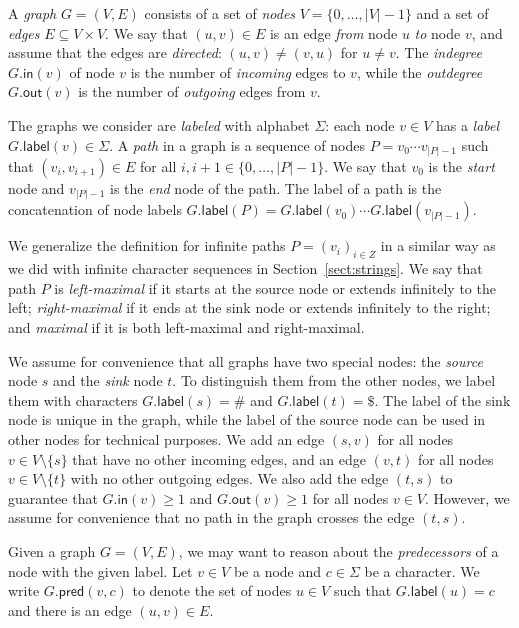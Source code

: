 \documentclass[a4paper,UKenglish]{lipics-v2016}
\newcommand{\set}[1]{\ensuremath{\{ #1 \}}}
\newcommand{\abs}[1]{\ensuremath{\lvert #1 \rvert}}
\newcommand{\gindegree}{\ensuremath{\mathsf{in}}}
\newcommand{\goutdegree}{\ensuremath{\mathsf{out}}}
\newcommand{\glabel}{\ensuremath{\mathsf{label}}}
\newcommand{\gpred}{\ensuremath{\mathsf{pred}}}
\begin{document}
A \emph{graph} $G = (V, E)$ consists of a set of \emph{nodes} $V = \set{0, \dotsc, \abs{V}-1}$ and a set of \emph{edges} $E \subseteq V \times V$. We say that $(u, v) \in E$ is an edge \emph{from} node $u$ \emph{to} node $v$, and assume that the edges are \emph{directed}: $(u, v) \ne (v, u)$ for $u \ne v$. The \emph{indegree} $G.\gindegree(v)$ of node $v$ is the number of \emph{incoming} edges to $v$, while the \emph{outdegree} $G.\goutdegree(v)$ is the number of \emph{outgoing} edges from $v$.

The graphs we consider are \emph{labeled} with alphabet $\Sigma$: each node $v \in V$ has a \emph{label} $G.\glabel(v) \in \Sigma$. A \emph{path} in a graph is a sequence of nodes $P = v_{0} \dotsm v_{\abs{P}-1}$ such that $(v_{i}, v_{i+1}) \in E$ for all $i, i+1 \in \set{0, \dotsc, \abs{P}-1}$. We say that $v_{0}$ is the \emph{start} node and $v_{\abs{P}-1}$ is the \emph{end} node of the path. The label of a path is the concatenation of node labels $G.\glabel(P) = G.\glabel(v_{0}) \dotsm G.\glabel(v_{\abs{P}-1})$.

We generalize the definition for infinite paths $P = (v_{i})_{i \in Z}$ in a similar way as we did with infinite character sequences in Section~\ref{sect:strings}. We say that path $P$ is \emph{left-maximal} if it starts at the source node or extends infinitely to the left; \emph{right-maximal} if it ends at the sink node or extends infinitely to the right; and \emph{maximal} if it is both left-maximal and right-maximal.

We assume for convenience that all graphs have two special nodes: the \emph{source} node $s$ and the \emph{sink} node $t$. To distinguish them from the other nodes, we label them with characters $G.\glabel(s) = \#$ and $G.\glabel(t) = \$$. The label of the sink node is unique in the graph, while the label of the source node can be used in other nodes for technical purposes. We add an edge $(s, v)$ for all nodes $v \in V \setminus \set{s}$ that have no other incoming edges, and an edge $(v, t)$ for all nodes $v \in V \setminus \set{t}$ with no other outgoing edges. We also add the edge $(t, s)$ to guarantee that $G.\gindegree(v) \ge 1$ and $G.\goutdegree(v) \ge 1$ for all nodes $v \in V$. However, we assume for convenience that no path in the graph crosses the edge $(t, s)$.

Given a graph $G = (V, E)$, we may want to reason about the \emph{predecessors} of a node with the given label. Let $v \in V$ be a node and $c \in \Sigma$ be a character. We write $G.\gpred(v, c)$ to denote the set of nodes $u \in V$ such that $G.\glabel(u) = c$ and there is an edge $(u, v) \in E$.
\end{document}
